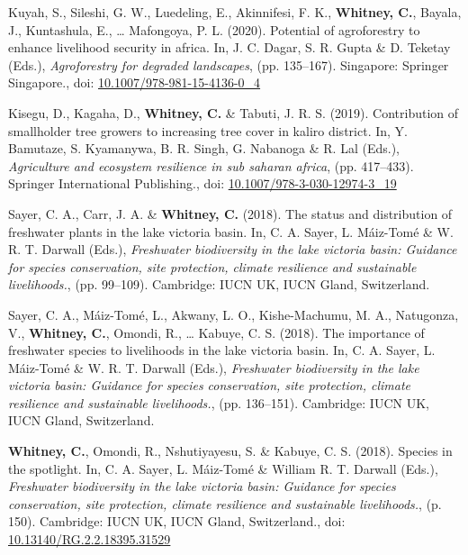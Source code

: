 \documentclass[11pt,a4paper,]{awesome-cv}
\newlength{\cslhangindent}
\newenvironment{CSLReferences}[2] %
 {\begin{list}{}{%
  \setlength{\itemindent}{0pt}
  \setlength{\leftmargin}{0pt}
  \setlength{\parsep}{0pt}
  \ifodd #1
   \setlength{\leftmargin}{\cslhangindent}
   \setlength{\itemindent}{-1\cslhangindent}
  \fi
  \setlength{\itemsep}{#2\baselineskip}}}
 {\end{list}}
\begin{document}
\label{refs-7e0891a4ae643cb844e10c017087a198}
\begin{CSLReferences}{1}{0}
Kuyah, S., Sileshi, G. W., Luedeling, E., Akinnifesi, F. K.,
\textbf{Whitney, C.}, Bayala, J., Kuntashula, E., \ldots{} Mafongoya, P.
L. (2020). Potential of agroforestry to enhance livelihood security in
africa. In, J. C. Dagar, S. R. Gupta \& D. Teketay (Eds.),
\emph{Agroforestry for degraded landscapes}, (pp. 135--167). Singapore:
Springer Singapore., doi:
\href{https://doi.org/10.1007/978-981-15-4136-0_4}{10.1007/978-981-15-4136-0\_4}

Kisegu, D., Kagaha, D., \textbf{Whitney, C.} \& Tabuti, J. R. S. (2019).
Contribution of smallholder tree growers to increasing tree cover in
kaliro district. In, Y. Bamutaze, S. Kyamanywa, B. R. Singh, G. Nabanoga
\& R. Lal (Eds.), \emph{Agriculture and ecosystem resilience in sub
saharan africa}, (pp. 417--433). Springer International Publishing.,
doi:
\href{https://doi.org/10.1007/978-3-030-12974-3_19}{10.1007/978-3-030-12974-3\_19}

Sayer, C. A., Carr, J. A. \& \textbf{Whitney, C.} (2018). The status and
distribution of freshwater plants in the lake victoria basin. In, C. A.
Sayer, L. Máiz-Tomé \& W. R. T. Darwall (Eds.), \emph{Freshwater
biodiversity in the lake victoria basin: Guidance for species
conservation, site protection, climate resilience and sustainable
livelihoods.}, (pp. 99--109). Cambridge: IUCN UK, IUCN Gland,
Switzerland.

Sayer, C. A., Máiz-Tomé, L., Akwany, L. O., Kishe-Machumu, M. A.,
Natugonza, V., \textbf{Whitney, C.}, Omondi, R., \ldots{} Kabuye, C. S.
(2018). The importance of freshwater species to livelihoods in the lake
victoria basin. In, C. A. Sayer, L. Máiz-Tomé \& W. R. T. Darwall
(Eds.), \emph{Freshwater biodiversity in the lake victoria basin:
Guidance for species conservation, site protection, climate resilience
and sustainable livelihoods.}, (pp. 136--151). Cambridge: IUCN UK, IUCN
Gland, Switzerland.

\textbf{Whitney, C.}, Omondi, R., Nshutiyayesu, S. \& Kabuye, C. S.
(2018). Species in the spotlight. In, C. A. Sayer, L. Máiz-Tomé \&
William R. T. Darwall (Eds.), \emph{Freshwater biodiversity in the lake
victoria basin: Guidance for species conservation, site protection,
climate resilience and sustainable livelihoods.}, (p. 150). Cambridge:
IUCN UK, IUCN Gland, Switzerland., doi:
\href{https://doi.org/10.13140/RG.2.2.18395.31529}{10.13140/RG.2.2.18395.31529}


\end{CSLReferences}
\end{document}

